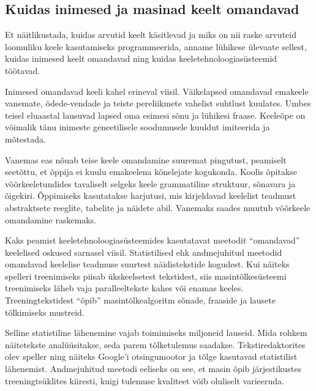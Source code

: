 \documentclass[]{../metanetpaper}
\begin{document}
\begin{multicols}{2}
\subsection{Kuidas inimesed ja masinad keelt omandavad}

Et näitlikustada, kuidas arvutid keelt käsitlevad ja miks on nii raske arvuteid loomuliku keele kasutamiseks programmeerida, anname lühikese ülevaate sellest, kuidas inimesed keelt omandavad ning kuidas keeletehnoloogiasüsteemid töötavad. 



Inimesed omandavad keeli kahel erineval viisil. 
Väikelapsed omandavad emakeele vanemate, õdede-vendade ja teiste pere\-liikmete vahelist suhtlust kuulates. 
Umbes teisel eluaastal lausuvad lapsed oma esi\-mesi sõnu ja lühikesi fraase. 
Keeleõpe on võimalik tänu inimeste geneetilisele soodumusele kuuldut imiteerida ja mõtestada.

Vanemas eas nõuab teise keele omandamine suuremat pingutust, peamiselt seetõttu, et õppija ei kuulu emakeelena kõnelejate kogukonda. 
Koolis õpitakse võõrkeeletundides tavaliselt selgeks keele grammatiline struktuur, sõnavara ja õigekiri. 
Õppimiseks kasutatakse harjutusi, mis kirjeldavad keelelist teadmust abstraktsete reeglite, tabelite ja näidete abil.
Vanemaks saades muutub võõrkeele omandamine raskemaks.

Kaks peamist keeletehnoloogiasüsteemides kasutatavat meetodit ``omandavad'' keele\-lised oskused sarnasel viisil. 
Statistilised ehk andmejuhitud meetodid omandavad keelelise teadmuse suurtest näidistekstide kogudest. 
Kui näiteks spelleri treeni\-miseks piisab ükskeelsetest tekstidest, siis masintõlkesüsteemi treenimiseks läheb vaja paralleeltekste kahes või enamas keeles. 
Treeningtekstidest ``õpib'' masintõlkealgoritm sõnade, fraaside ja lausete tõlkimiseks mustreid. 

Selline statistiline lähenemine vajab toimi\-miseks miljoneid lauseid. 
Mida rohkem näitetekste analüüsitakse, seda parem tõlketulemus saadakse. 
Tekstiredaktorites olev speller ning näiteks Google’i otsingumootor ja tõlge kasutavad statistilist lähe\-ne\-mist. 
Andmejuhitud meetodi eeliseks on see, et masin õpib järjestikustes treening\-tsüklites kiiresti, kuigi tulemuse kvaliteet võib oluliselt varieeruda.


\end{multicols}
\end{document}
